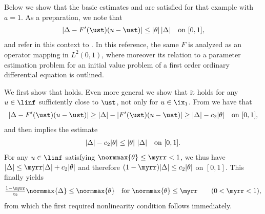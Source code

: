\documentclass[10pt]{article}
\theoremstyle{definition}
\begin{document}
Below we show that the basic estimates  and
 are satisfied for that example with $a=1$. As a preparation, we note that
%
\begin{align}
\vert \Delta-  F^\prime(\ust) (u-\ust) \vert
\le \vert \theta \vert \, \vert \Delta \vert \quad \textup{on } [0,1],
\label{eq:hofmann-estimate}
\end{align}
%
and refer in this context to \cite[Sect.~4.4]{HHMP22}. In this reference,
the  same $F$ is analyzed as an operator mapping in $L^2(0,1)$, where moreover
its relation to a parameter estimation problem
for an initial value problem of a first order ordinary differential equation
is outlined.
%
\begin{myenumerate}
\item
We first show that  holds. Even more general we show that it holds for any $ u \in \linf $ sufficiently close to $ \ust $, not only for $ u \in \ix_1$.
From  we have that
%
\begin{align*}
\vert \Delta-  F^\prime(\ust) (u-\ust) \vert
\ge
\vert \Delta \vert -  \vert F^\prime(\ust) (u-\ust) \vert
\ge
\vert \Delta \vert - c_2 \vert \theta \vert \quad \textup{on } [0,1],
\end{align*}
%
and  then implies the estimate
%
\begin{align*}
\vert \Delta \vert - c_2 \vert \theta \vert
\le
\vert \theta \vert \ \vert \Delta \vert
\quad \textup{on } [0,1].
\end{align*}
%
For any $ u \in \linf $ satisfying $ \normmax{\theta} \le \myrr < 1 $, we thus have
%
$ \vert \Delta \vert \le \myrr \vert \Delta \vert + c_2 \vert \theta \vert$
and therefore
%
$ (1-\myrr)\vert \Delta \vert \le c_2 \vert \theta \vert $
on $ [0,1] $.
%
This finally yields
%
$$ \tfrac{1-\myrr}{c_2} \normmax{\Delta} \le \normmax{\theta} \quad \textup{for }
\normmax{\theta} \le \myrr \qquad (0 < \myrr < 1),
$$
%
from which the first required nonlinearity condition  follows immediately.


\end{myenumerate}
\end{document}
